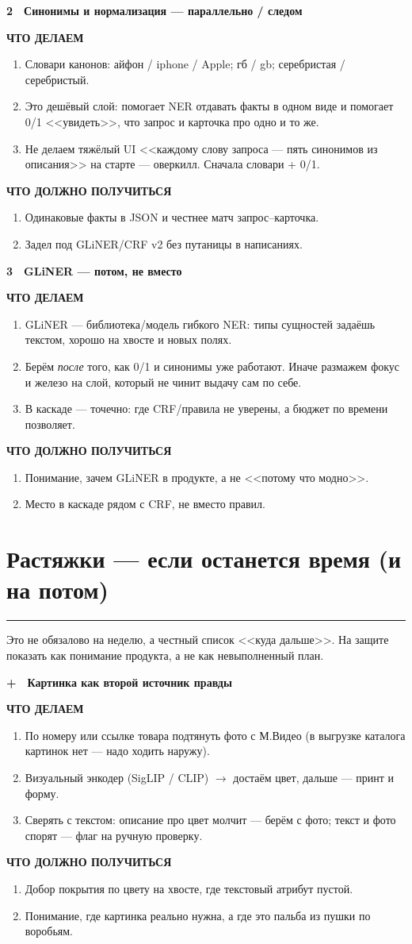 \documentclass[11pt,a4paper]{article}
\newcommand{\secrule}{%
  \par\vspace{4pt}%
  {\color{mvred}\noindent\rule{\linewidth}{0.9pt}\par}%
  \vspace{8pt}%
}
\newcommand{\daysection}[1]{%
  \Needspace{22\baselineskip}%
  \section{#1}\secrule
}
\newcommand{\dayblock}[4]{%
  \begin{tcolorbox}[
    enhanced,
    colback=white,
    colframe=rulec,
    boxrule=0.65pt,
    arc=2pt,
    left=8pt,
    right=8pt,
    top=8pt,
    bottom=8pt,
    before skip=3pt,
    after skip=11pt,
  ]
  {\color{mvred}\bfseries #1}~~{\bfseries #2}\par\vspace{4pt}%
  {\scriptsize\bfseries\color{inksoft}ЧТО ДЕЛАЕМ}\par\vspace{1pt}%
  #3\par\vspace{5pt}%
  {\scriptsize\bfseries\color{mint}ЧТО ДОЛЖНО ПОЛУЧИТЬСЯ}\par\vspace{1pt}%
  #4%
  \end{tcolorbox}%
}
\begin{document}
\dayblock{2}{Синонимы и нормализация --- параллельно / следом}{%
\begin{enumerate}
  \item Словари канонов: айфон / iphone / Apple; гб / gb; серебристая / серебристый.
  \item Это дешёвый слой: помогает NER отдавать факты в одном виде и помогает 0/1 <<увидеть>>, что запрос и карточка про одно и то же.
  \item Не делаем тяжёлый UI <<каждому слову запроса --- пять синонимов из описания>> на старте --- оверкилл. Сначала словари + 0/1.
\end{enumerate}
}{%
\begin{enumerate}
  \item Одинаковые факты в JSON и честнее матч запрос--карточка.
  \item Задел под GLiNER/CRF v2 без путаницы в написаниях.
\end{enumerate}
}

\dayblock{3}{GLiNER --- потом, не вместо}{%
\begin{enumerate}
  \item GLiNER --- библиотека/модель гибкого NER: типы сущностей задаёшь текстом, хорошо на хвосте и новых полях.
  \item Берём \emph{после} того, как 0/1 и синонимы уже работают. Иначе размажем фокус и железо на слой, который не чинит выдачу сам по себе.
  \item В каскаде --- точечно: где CRF/правила не уверены, а бюджет по времени позволяет.
\end{enumerate}
}{%
\begin{enumerate}
  \item Понимание, зачем GLiNER в продукте, а не <<потому что модно>>.
  \item Место в каскаде рядом с CRF, не вместо правил.
\end{enumerate}
}

\daysection{Растяжки --- если останется время (и на потом)}
Это не обязалово на неделю, а честный список <<куда дальше>>. На защите показать как понимание продукта, а не как невыполненный план.

\dayblock{+}{Картинка как второй источник правды}{%
\begin{enumerate}
  \item По номеру или ссылке товара подтянуть фото с М.Видео (в выгрузке каталога картинок нет --- надо ходить наружу).
  \item Визуальный энкодер (SigLIP / CLIP) $\to$ достаём цвет, дальше --- принт и форму.
  \item Сверять с текстом: описание про цвет молчит --- берём с фото; текст и фото спорят --- флаг на ручную проверку.
\end{enumerate}
}{%
\begin{enumerate}
  \item Добор покрытия по цвету на хвосте, где текстовый атрибут пустой.
  \item Понимание, где картинка реально нужна, а где это пальба из пушки по воробьям.
\end{enumerate}
}
\end{document}
